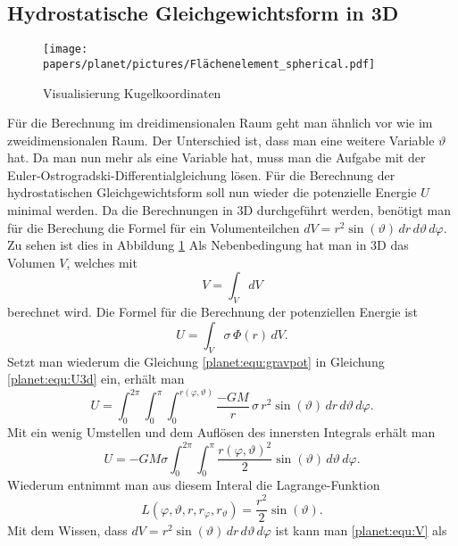 \subsection{Hydrostatische Gleichgewichtsform in 3D}
\begin{figure}
	\centering
	\texttt{[image: papers/planet/pictures/Flächenelement\_spherical.pdf]}
	\caption{Visualisierung Kugelkoordinaten}
%
	\label{planet:fig:3d}
\end{figure}
Für die Berechnung im dreidimensionalen Raum geht man ähnlich vor wie im zweidimensionalen Raum.
Der Unterschied ist, dass man eine weitere Variable \(\vartheta\) hat.
Da man nun mehr als eine Variable hat, muss man die Aufgabe mit der Euler-Ostrogradski-Dif\-fe\-ren\-ti\-al\-glei\-chung lösen.
Für die Berechnung der hydrostatischen Gleichgewichtsform soll nun wieder die potenzielle Energie \(U\) minimal werden.
Da die Berechnungen in 3D durchgeführt werden, benötigt man für die Berechung die Formel für ein Volumenteilchen \(dV = r^2 \sin (\vartheta) \, dr \, d\vartheta \, d\varphi \).
Zu sehen ist dies in Abbildung \ref{planet:fig:3d}
Als Nebenbedingung hat man in 3D das Volumen \(V\), welches mit 
\begin{equation}
	V = \int_{V}^{} dV
	\label{planet:equ:V}
\end{equation}
berechnet wird.
Die Formel für die Berechnung der potenziellen Energie ist
\begin{equation}
	U = \int_{V} \sigma \,  \Phi (r)\, dV.
	\label{planet:equ:U3d}
\end{equation}
Setzt man wiederum die Gleichung \eqref{planet:equ:gravpot} in Gleichung \eqref{planet:equ:U3d} ein, erhält man
\begin{equation*}
	U = \int_{0}^{2\pi}
	\int_{0}^{\pi}
	\int_{0}^{r(\varphi,\vartheta)}
	\frac{-GM}{r}\, \sigma\, r^2 \sin (\vartheta) \,
	dr \, d\vartheta \, d\varphi.
\end{equation*}
Mit ein wenig Umstellen und dem Auflösen des innersten Integrals erhält man
\begin{equation*}
	U =-GM\sigma \int_{0}^{2\pi}\int_{0}^{\pi}\frac{r(\varphi,\vartheta)^2}{2}  \sin (\vartheta) \, d\vartheta \, d\varphi.
\end{equation*}
Wiederum entnimmt man aus diesem Interal die Lagrange-Funktion
\begin{equation*}
	L(\varphi,\vartheta ,r,r_\varphi,r_\vartheta) = \frac{r^2}{2}  \sin (\vartheta).
\end{equation*}
Mit dem Wissen, dass \(dV = r^2 \sin (\vartheta) \, dr \, d\vartheta \, d\varphi \) ist kann man \eqref{planet:equ:V} als
